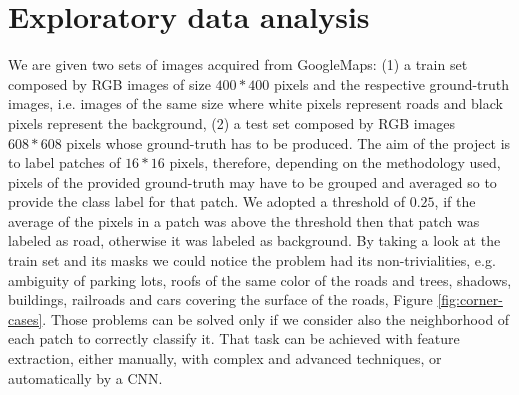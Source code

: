 \documentclass[10pt,conference,compsocconf]{IEEEtran}
\begin{document}


\section{Exploratory data analysis}
\label{sec:data-analysis}
We are given two sets of images acquired from GoogleMaps: (1) a train set composed by RGB images of size $400*400$ pixels and the respective ground-truth images, i.e. images of the same size where white pixels represent roads and black pixels represent the background, (2) a test set composed by RGB images $608*608$ pixels whose ground-truth has to be produced. 
The aim of the project is to label patches of $16*16$ pixels, therefore, depending on the methodology used, pixels of the provided ground-truth may have to be grouped and averaged so to provide the class label for that patch. We adopted a threshold of $0.25$, if the average of the pixels in a patch was above the threshold then that patch was labeled as road, otherwise it was labeled as background.
By taking a look at the train set and its masks we could notice the problem had its non-trivialities, e.g. ambiguity of parking lots, roofs of the same color of the roads and trees, shadows, buildings, railroads and cars covering the surface of the roads, Figure \ref{fig:corner-cases}. Those problems can be solved only if we consider also the neighborhood of each patch to correctly classify it. That task can be achieved with feature extraction, either manually, with complex and advanced techniques, or automatically by a CNN.  
\end{document}
